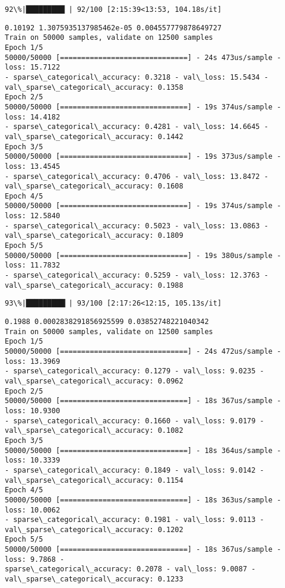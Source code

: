 \documentclass[11pt]{article}
\begin{document}
    \begin{Verbatim}[commandchars=\\\{\}]
 92\%|█████████▏| 92/100 [2:15:39<13:53, 104.18s/it]
    \end{Verbatim}

    \begin{Verbatim}[commandchars=\\\{\}]
0.10192 1.3075935137985462e-05 0.004557779878649727
Train on 50000 samples, validate on 12500 samples
Epoch 1/5
50000/50000 [==============================] - 24s 473us/sample - loss: 15.7122
- sparse\_categorical\_accuracy: 0.3218 - val\_loss: 15.5434 -
val\_sparse\_categorical\_accuracy: 0.1358
Epoch 2/5
50000/50000 [==============================] - 19s 374us/sample - loss: 14.4182
- sparse\_categorical\_accuracy: 0.4281 - val\_loss: 14.6645 -
val\_sparse\_categorical\_accuracy: 0.1442
Epoch 3/5
50000/50000 [==============================] - 19s 373us/sample - loss: 13.4545
- sparse\_categorical\_accuracy: 0.4706 - val\_loss: 13.8472 -
val\_sparse\_categorical\_accuracy: 0.1608
Epoch 4/5
50000/50000 [==============================] - 19s 374us/sample - loss: 12.5840
- sparse\_categorical\_accuracy: 0.5023 - val\_loss: 13.0863 -
val\_sparse\_categorical\_accuracy: 0.1809
Epoch 5/5
50000/50000 [==============================] - 19s 380us/sample - loss: 11.7832
- sparse\_categorical\_accuracy: 0.5259 - val\_loss: 12.3763 -
val\_sparse\_categorical\_accuracy: 0.1988
    \end{Verbatim}

    \begin{Verbatim}[commandchars=\\\{\}]
 93\%|█████████▎| 93/100 [2:17:26<12:15, 105.13s/it]
    \end{Verbatim}

    \begin{Verbatim}[commandchars=\\\{\}]
0.1988 0.0002838291856925599 0.03852748221040342
Train on 50000 samples, validate on 12500 samples
Epoch 1/5
50000/50000 [==============================] - 24s 472us/sample - loss: 13.3969
- sparse\_categorical\_accuracy: 0.1279 - val\_loss: 9.0235 -
val\_sparse\_categorical\_accuracy: 0.0962
Epoch 2/5
50000/50000 [==============================] - 18s 367us/sample - loss: 10.9300
- sparse\_categorical\_accuracy: 0.1660 - val\_loss: 9.0179 -
val\_sparse\_categorical\_accuracy: 0.1082
Epoch 3/5
50000/50000 [==============================] - 18s 364us/sample - loss: 10.3339
- sparse\_categorical\_accuracy: 0.1849 - val\_loss: 9.0142 -
val\_sparse\_categorical\_accuracy: 0.1154
Epoch 4/5
50000/50000 [==============================] - 18s 363us/sample - loss: 10.0062
- sparse\_categorical\_accuracy: 0.1981 - val\_loss: 9.0113 -
val\_sparse\_categorical\_accuracy: 0.1202
Epoch 5/5
50000/50000 [==============================] - 18s 367us/sample - loss: 9.7868 -
sparse\_categorical\_accuracy: 0.2078 - val\_loss: 9.0087 -
val\_sparse\_categorical\_accuracy: 0.1233
    \end{Verbatim}
\end{document}
